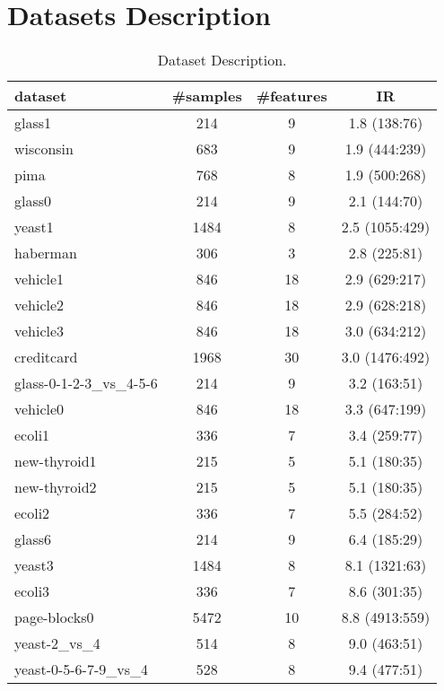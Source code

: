  



\section{Datasets Description}
\label{apx.dataDecription}

\begin{table}[!htbp]
	\centering
	\caption{Dataset Description.}
	
	\begin{tabular}{lccc}
		\hline
		dataset & \#samples & \#features & IR \bigstrut\\
		\hline
		glass1 & 214   & 9     & 1.8 (138:76)\bigstrut[t]\\
		wisconsin & 683   & 9     & 1.9 (444:239) \\
		pima  & 768   & 8     & 1.9 (500:268)\\
		glass0 & 214   & 9     & 2.1 (144:70) \\
		yeast1 & 1484  & 8     & 2.5 (1055:429)\\
		haberman & 306   & 3     & 2.8 (225:81) \\
		vehicle1 & 846   & 18    & 2.9 (629:217)\\
		vehicle2 & 846   & 18    & 2.9 (628:218)\\
		vehicle3 & 846   & 18    & 3.0 (634:212)\\
		creditcard & 1968  & 30    & 3.0 (1476:492)\\
		glass-0-1-2-3\_vs\_4-5-6 & 214   & 9     & 3.2 (163:51)\\
		vehicle0 & 846   & 18    & 3.3 (647:199)\\
		ecoli1 & 336   & 7     & 3.4 (259:77)\\
		new-thyroid1 & 215   & 5     & 5.1 (180:35) \\
		new-thyroid2 & 215   & 5     & 5.1 (180:35)\\
		ecoli2 & 336   & 7     & 5.5 (284:52)\\
		glass6 & 214   & 9     & 6.4 (185:29)\\
		yeast3 & 1484  & 8     & 8.1 (1321:63)\\
		ecoli3 & 336   & 7     & 8.6 (301:35)\\
		page-blocks0 & 5472  & 10    & 8.8 (4913:559)\\
		yeast-2\_vs\_4 & 514   & 8     & 9.0 (463:51)\\
		yeast-0-5-6-7-9\_vs\_4 & 528   & 8     & 9.4 (477:51)\\

\end{tabular}
\end{table}
